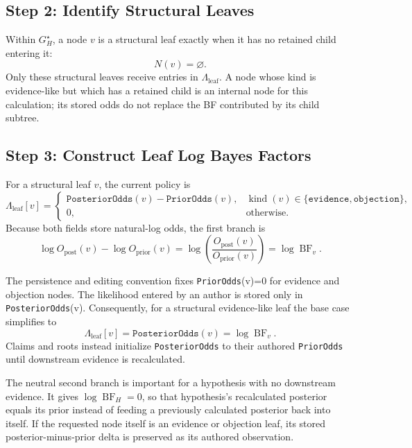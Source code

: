 \documentclass[11pt]{article}
\newcommand{\BF}{\operatorname{BF}}
\begin{document}
\subsection{Step 2: Identify Structural Leaves}

Within \(G_H^{\star}\), a node \(v\) is a structural leaf exactly when it has
no retained child entering it:
\[
    N(v)=\varnothing.
\]
Only these structural leaves receive entries in
\(\Lambda_{\mathrm{leaf}}\).  A node whose kind is evidence-like but which has
a retained child is an internal node for this calculation; its stored odds do
not replace the BF contributed by its child subtree.

\subsection{Step 3: Construct Leaf Log Bayes Factors}

For a structural leaf \(v\), the current policy is
\[
    \Lambda_{\mathrm{leaf}}[v]
      =
      \begin{cases}
        \texttt{PosteriorOdds}(v)-\texttt{PriorOdds}(v),
          & \operatorname{kind}(v)\in
            \{\texttt{evidence},\texttt{objection}\},\\[0.6em]
        0,
          & \text{otherwise.}
      \end{cases}
\]
Because both fields store natural-log odds, the first branch is
\[
    \log O_{\mathrm{post}}(v)-\log O_{\mathrm{prior}}(v)
      =\log\!\left(
          \frac{O_{\mathrm{post}}(v)}{O_{\mathrm{prior}}(v)}
        \right)
      =\log\BF_v.
\]

The persistence and editing convention fixes \texttt{PriorOdds}(v)=0 for
evidence and objection nodes.  The likelihood entered by an author is stored
only in \texttt{PosteriorOdds}(v).  Consequently, for a structural
evidence-like leaf the base case simplifies to
\[
    \Lambda_{\mathrm{leaf}}[v]=\texttt{PosteriorOdds}(v)=\log\BF_v.
\]
Claims and roots instead initialize \texttt{PosteriorOdds} to their authored
\texttt{PriorOdds} until downstream evidence is recalculated.

The neutral second branch is important for a hypothesis with no downstream
evidence.  It gives \(\log\BF_H=0\), so that hypothesis's recalculated
posterior equals its prior instead of feeding a previously calculated
posterior back into itself.  If the requested node itself is an evidence or
objection leaf, its stored posterior-minus-prior delta is preserved as its
authored observation.
\end{document}
